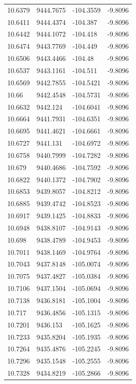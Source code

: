 \begin{table}[H]
\begin{tabular}{llll}
10.6379 & 9444.7675 & -104.3559 & -9.8096 \\
10.6411 & 9444.4374 & -104.387 & -9.8096 \\
10.6442 & 9444.1072 & -104.418 & -9.8096 \\
10.6474 & 9443.7769 & -104.449 & -9.8096 \\
10.6506 & 9443.4466 & -104.48 & -9.8096 \\
10.6537 & 9443.1161 & -104.511 & -9.8096 \\
10.6569 & 9442.7855 & -104.5421 & -9.8096 \\
10.66 & 9442.4548 & -104.5731 & -9.8096 \\
10.6632 & 9442.124 & -104.6041 & -9.8096 \\
10.6664 & 9441.7931 & -104.6351 & -9.8096 \\
10.6695 & 9441.4621 & -104.6661 & -9.8096 \\
10.6727 & 9441.131 & -104.6972 & -9.8096 \\
10.6758 & 9440.7999 & -104.7282 & -9.8096 \\
10.679 & 9440.4686 & -104.7592 & -9.8096 \\
10.6822 & 9440.1372 & -104.7902 & -9.8096 \\
10.6853 & 9439.8057 & -104.8212 & -9.8096 \\
10.6885 & 9439.4742 & -104.8523 & -9.8096 \\
10.6917 & 9439.1425 & -104.8833 & -9.8096 \\
10.6948 & 9438.8107 & -104.9143 & -9.8096 \\
10.698 & 9438.4789 & -104.9453 & -9.8096 \\
10.7011 & 9438.1469 & -104.9764 & -9.8096 \\
10.7043 & 9437.8148 & -105.0074 & -9.8096 \\
10.7075 & 9437.4827 & -105.0384 & -9.8096 \\
10.7106 & 9437.1504 & -105.0694 & -9.8096 \\
10.7138 & 9436.8181 & -105.1004 & -9.8096 \\
10.717 & 9436.4856 & -105.1315 & -9.8096 \\
10.7201 & 9436.153 & -105.1625 & -9.8096 \\
10.7233 & 9435.8204 & -105.1935 & -9.8096 \\
10.7264 & 9435.4876 & -105.2245 & -9.8096 \\
10.7296 & 9435.1548 & -105.2555 & -9.8096 \\
10.7328 & 9434.8219 & -105.2866 & -9.8096 \\

\end{tabular}
\end{table}

